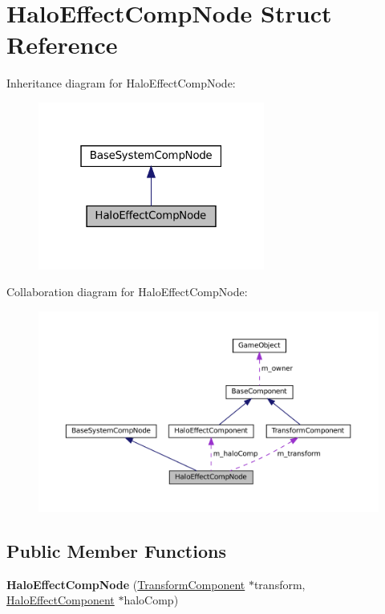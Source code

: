 \hypertarget{structHaloEffectCompNode}{}\section{Halo\+Effect\+Comp\+Node Struct Reference}
\label{structHaloEffectCompNode}


Inheritance diagram for Halo\+Effect\+Comp\+Node\+:\nopagebreak
\begin{figure}[H]
\begin{center}
\leavevmode
\includegraphics[width=211pt]{structHaloEffectCompNode__inherit__graph}
\end{center}
\end{figure}


Collaboration diagram for Halo\+Effect\+Comp\+Node\+:\nopagebreak
\begin{figure}[H]
\begin{center}
\leavevmode
\includegraphics[width=350pt]{structHaloEffectCompNode__coll__graph}
\end{center}
\end{figure}
\subsection*{Public Member Functions}
\begin{DoxyCompactItemize}
\item 
\mbox{\label{structHaloEffectCompNode_a3773e9541d9aa7d2b8f4410fadfa643d}} 
{\bfseries Halo\+Effect\+Comp\+Node} (\hyperlink{classTransformComponent}{Transform\+Component} $\ast$transform, \hyperlink{classHaloEffectComponent}{Halo\+Effect\+Component} $\ast$halo\+Comp)
\end{DoxyCompactItemize}
